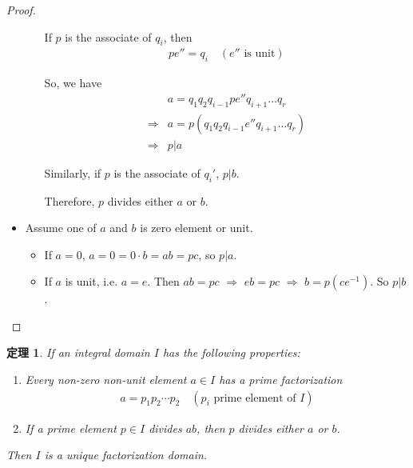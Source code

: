 \documentclass[utf8]{ctexbook}
\newtheorem{theorem}{定理}[section]
\begin{document}
\begin{proof}
\begin{itemize}
\begin{itemize}
{If $p$ is the associate of $q_i$, then 
\begin{align*}
p e'' = q_i \quad (e'' \mbox{ is unit})
\end{align*}

So, we have
\begin{align*}
& a =  q_1 q_2 q_{i-1} p e'' q_{i+1} \ldots q_r  \\
\Longrightarrow & a = p (q_1 q_2 q_{i-1} e'' q_{i+1} \ldots q_r) \\
\Longrightarrow & p | a
\end{align*}

Similarly, if $p$ is the associate of $q_i '$, $p|b$.

Therefore, $p$ divides either $a$ or $b$.
}
\end{itemize}

\item{Assume one of $a$ and $b$ is zero element or unit.
\begin{itemize}
\item{If $a=0$, $a = 0= 0 \cdot b = a b = p  c$, so $p|a$.}
\item{If $a$ is unit, i.e. $a=e$. Then $ab = pc$ $\Longrightarrow$ $e b = pc$ $\Longrightarrow$ $b = p( c e^{-1} ) $. So $p |b$.}
\end{itemize}
}
\end{itemize}

\end{proof}


\begin{theorem}\label{theorem_2_UFD}
If an integral domain $I$ has the following properties:
\begin{enumerate}
\item{Every non-zero non-unit element $a \in I$ has a prime factorization
\begin{align*}
a = p_1 p_2 \cdots p_2 \quad (p_i \mbox{ prime element of } I)
\end{align*}
\label{theorem_2_UFD_property_1}
}
\item{If a prime element $p\in I$ divides $ab$, then $p$ divides either $a$ or $b$.
\label{theorem_2_UFD_property_2}
}
\end{enumerate}
Then $I$ is a \emph{unique factorization domain}.

\end{theorem}
\end{document}
